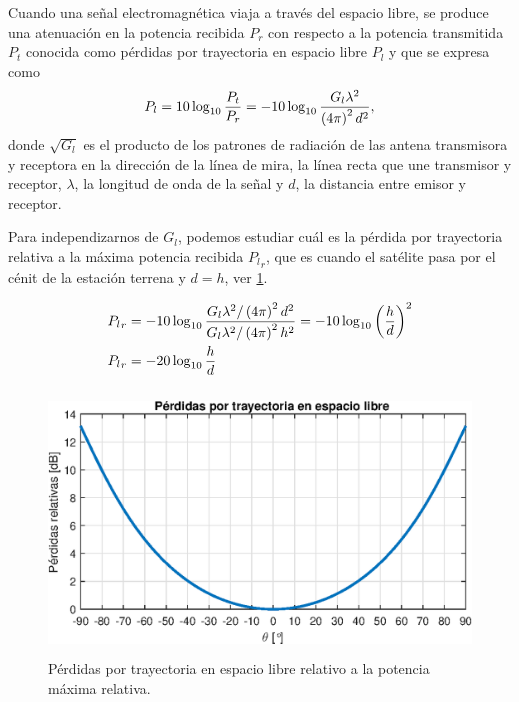\documentclass{article}
\newenvironment{standalone}{\begin{preview}}{\end{preview}}
\begin{document}
\begin{standalone}
  Cuando una señal electromagnética viaja a través del espacio libre, se produce una atenuación en la potencia recibida $P_r$ con respecto a la potencia transmitida $P_t$ conocida como pérdidas por trayectoria en espacio libre $P_l$ y que se expresa como \cite[29]{goldsmith2004}
  \begin{equation}
    P_l = 10 \log_{10}{ \frac{P_t}{P_r} } = -10 \log_{10}{ \frac{G_l \lambda^2}{\left( 4\pi \right)^2 d^2} },
    \tagaddtext{[\si{\decibel}]}
  \end{equation}
  donde $\sqrt{G_l}$ es el producto de los patrones de radiación de las antena transmisora y receptora en la dirección de la línea de mira, la línea recta que une transmisor y receptor, $\lambda$, la longitud de onda de la señal y $d$, la distancia entre emisor y receptor.

  Para independizarnos de $G_l$, podemos estudiar cuál es la pérdida por trayectoria relativa a la máxima potencia recibida ${P_l}_r$, que es cuando el satélite pasa por el cénit de la estación terrena y $d = h$, ver \cref{fig:free-space-path-loss}.

  \begin{align}
    {P_l}_r &= -10 \log_{10}{ \frac{ G_l \lambda^2 / \left( 4\pi \right)^2 d^2 }{ G_l \lambda^2 / \left( 4\pi \right)^2 h^2 }} = - 10 \log_{10}{ \left( \frac{h}{d} \right)^2} \nonumber \\
    {P_l}_r &= -20 \log_{10}{\frac{h}{d}}
    \tagaddtext{[\si{\decibel}]}
  \end{align}

  \begin{figure}[!htbp]
    \centering
    \includegraphics[width=\linewidth, height=70mm, keepaspectratio]{../images/free-space-path-loss.eps}
    \caption{Pérdidas por trayectoria en espacio libre relativo a la potencia máxima relativa.}
    \label{fig:free-space-path-loss}
  \end{figure}


\end{standalone}
\end{document}
